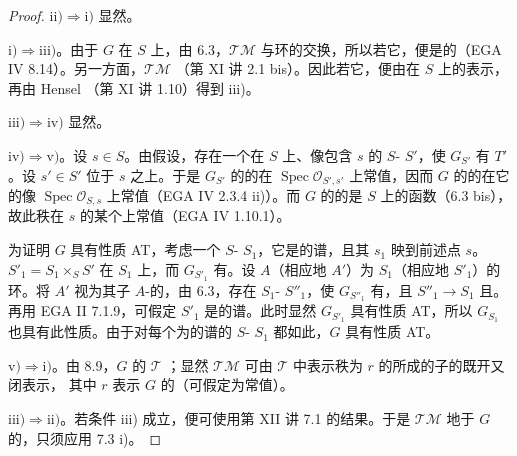 \begin{proof}
$\mathrm{ii)}\Rightarrow\mathrm{i)}$ 显然。

$\mathrm{i)}\Rightarrow\mathrm{iii)}$。由于 $G$ 在 $S$ 上，由 6.3，$\mathcal{TM}$ 与环的交换，所以若它，便是的（EGA IV 8.14）。另一方面，$\mathcal{TM}$ （第 XI 讲 2.1 bis）。因此若它，便由在 $S$ 上的表示，再由 Hensel （第 XI 讲 1.10）得到 iii)。

$\mathrm{iii)}\Rightarrow\mathrm{iv)}$ 显然。

$\mathrm{iv)}\Rightarrow\mathrm{v)}$。设 $s\in S$。由假设，存在一个在 $S$ 上、像包含 $s$ 的 $S$- $S'$，使 $G_{S'}$ 有 $T'$。设 $s'\in S'$ 位于 $s$ 之上。于是 $G_{S'}$ 的的在 $\operatorname{Spec}\mathcal O_{S',s'}$ 上常值，因而 $G$ 的的在它的像 $\operatorname{Spec}\mathcal O_{S,s}$ 上常值（EGA IV 2.3.4 ii)）。而 $G$ 的的是 $S$ 上的函数（6.3 bis），故此秩在 $s$ 的某个上常值（EGA IV 1.10.1）。

为证明 $G$ 具有性质 AT，考虑一个 $S$- $S_1$，它是的谱，且其 $s_1$ 映到前述点 $s$。 $S'_1=S_1\times_S S'$ 在 $S_1$ 上，而 $G_{S'_1}$ 有。设 $A$（相应地 $A'$）为 $S_1$（相应地 $S'_1$）的环。将 $A'$ 视为其子 $A$-的，由 6.3，存在 $S_1$- $S''_1$，使 $G_{S''_1}$ 有，且 $S''_1\to S_1$ 且。再用 EGA II 7.1.9，可假定 $S'_1$ 是的谱。此时显然 $G_{S'_1}$ 具有性质 AT，所以 $G_{S_1}$ 也具有此性质。由于对每个为的谱的 $S$- $S_1$ 都如此，$G$ 具有性质 AT。

$\mathrm{v)}\Rightarrow\mathrm{i)}$。由 8.9，$G$ 的 $\mathcal T$ ；显然 $\mathcal{TM}$ 可由 $\mathcal T$ 中表示秩为 $r$ 的所成的子的既开又闭表示，
其中 $r$ 表示 $G$ 的（可假定为常值）。

$\mathrm{iii)}\Rightarrow\mathrm{ii)}$。若条件 iii) 成立，便可使用第 XII 讲 7.1 的结果。于是 $\mathcal{TM}$ 地于 $G$ 的，只须应用 7.3 i)。
\end{proof}
